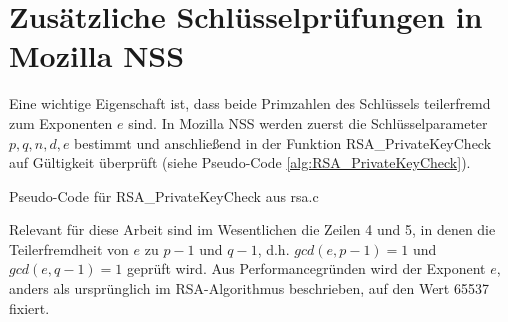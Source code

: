 


\section{Zusätzliche Schlüsselprüfungen in Mozilla NSS}
\label{RSAGenGCDAttack}

Eine wichtige Eigenschaft ist, dass beide Primzahlen des Schlüssels teilerfremd zum Exponenten $e$ sind.
In Mozilla NSS werden zuerst die Schlüsselparameter $p,q,n,d,e$ bestimmt und anschließend in der Funktion RSA_PrivateKeyCheck auf Gültigkeit überprüft (siehe Pseudo-Code \ref{alg:RSA_PrivateKeyCheck}).

\begin{algorithm}[h]
\DontPrintSemicolon
\caption{Pseudo-Code für RSA_PrivateKeyCheck aus rsa.c}
\label{alg:RSA_PrivateKeyCheck}

\end{algorithm}


%

Relevant für diese Arbeit sind im Wesentlichen die Zeilen 4 und 5, in denen die Teilerfremdheit von $e$ zu $p-1$ und $q-1$, d.h. $gcd(e,p-1) = 1$ und $gcd(e,q-1) = 1$ geprüft wird.
Aus Performancegründen wird der Exponent $e$, anders als ursprünglich im RSA-Algorithmus beschrieben, auf den Wert 65537 fixiert.

